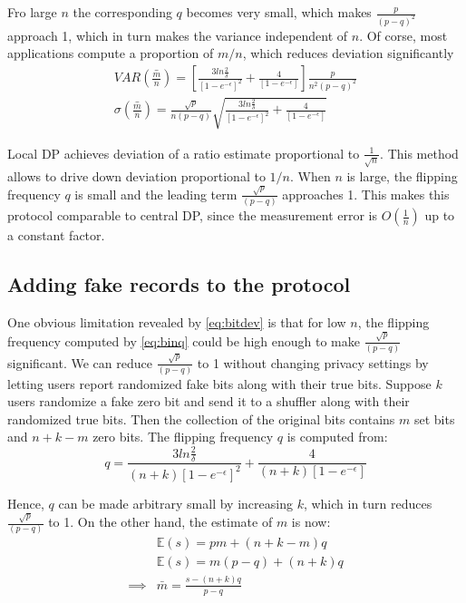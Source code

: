 \documentclass[11pt]{article}
\newcommand{\E}{\mathbb{E}} %
\begin{document}
Fro large $n$ the corresponding $q$ becomes very small, which makes $ \frac{p}{(p-q)^2}$ approach 1, which in turn makes the variance independent of $n$.
Of corse, most applications compute a proportion of $m/n$, which reduces deviation significantly
\begin{align}
VAR(\bar{\frac{m}{n}}) = \left [ \frac  { 3  ln\frac{2}{\delta}}  {\left [ 1 - e^{-\epsilon}\right ] ^2}  + \frac{4}{\left [ 1 - e^{-\epsilon}\right ] }  \right ] \frac{p}{n^2(p-q)^2} \\
\sigma(\bar{\frac{m}{n}}) = \frac{\sqrt{p}}{n(p-q)} \sqrt{ \frac  { 3  ln\frac{2}{\delta}}  {\left [ 1 - e^{-\epsilon}\right ] ^2}  + \frac{4}{\left [ 1 - e^{-\epsilon}\right ] }} \label{eq:bitdev}
\end{align}

Local DP achieves deviation of a ratio estimate proportional to $\frac{1}{\sqrt{n}}$.  This method allows to drive down deviation proportional to $1/n$.  When $n$ is large, the flipping frequency $q$ is small and the leading term $\frac{\sqrt{p}}{(p-q)}$ approaches 1.  This makes this protocol comparable to central DP, since the measurement error is $O(\frac{1}{n})$ up to a constant factor. 

\subsection{Adding fake records to the protocol}

One obvious limitation revealed by \ref{eq:bitdev} is that for low $n$, the flipping frequency computed by \ref{eq:binq} could be high enough to make $\frac{\sqrt{p}}{(p-q)}$ significant.   We can reduce $\frac{\sqrt{p}}{(p-q)}$  to 1 without changing privacy settings by letting users report randomized fake bits along with their true bits.  Suppose $k$ users randomize a fake zero bit and send it to a shuffler along with their randomized true bits.  Then the collection of the original bits contains $m$ set bits and $n+k - m$ zero bits.  The flipping frequency $q$ is computed from:
\[ q = \frac  { 3  ln\frac{2}{\delta}}  { (n+k) \left [ 1 - e^{-\epsilon}\right ] ^2}  + \frac{4}{(n+k) \left [ 1 - e^{-\epsilon}\right ] } \]

Hence, $q$ can be made arbitrary small by increasing $k$, which in turn reduces $\frac{\sqrt{p}}{(p-q)}$  to 1.   On the other hand, the estimate of $m$ is now:
\begin{align*}
& \E(s) = pm + (n+k-m)q \\
& \E(s) = m(p-q) + (n+k)q \\
\implies & \bar{m} = \frac{s - (n+k)q}{p-q}
\end{align*}
\end{document}
